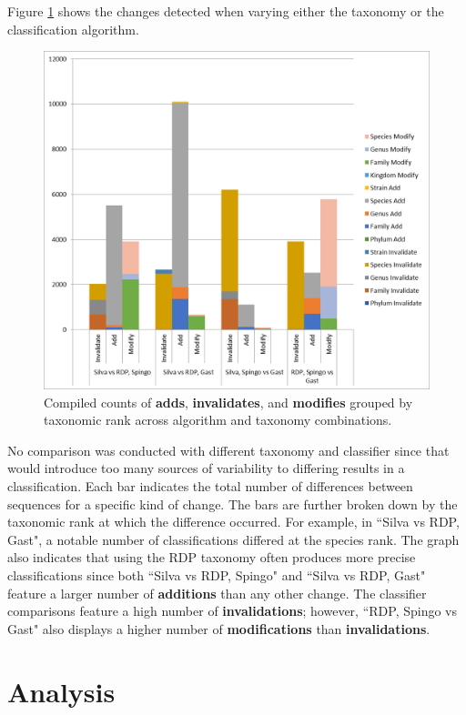 Figure \ref{mbvl_chart} shows the changes detected when varying either the taxonomy or the classification algorithm.
\begin{figure}
	\centering
	\includegraphics[scale=0.75]{figures/mbvl_chart.png}
	\caption{Compiled counts of \textbf{adds}, \textbf{invalidates}, and \textbf{modifies} grouped by taxonomic rank across algorithm and taxonomy combinations.}
	\label{mbvl_chart}
\end{figure}
No comparison was conducted with different taxonomy and classifier since that would introduce too many sources of variability to differing results in a classification.
Each bar indicates the total number of differences between sequences for a specific kind of change.
The bars are further broken down by the taxonomic rank at which the difference occurred.
For example, in ``Silva vs RDP, Gast", a notable number of classifications differed at the species rank.
The graph also indicates that using the RDP taxonomy often produces more precise classifications since both ``Silva vs RDP, Spingo" and ``Silva vs RDP, Gast" feature a larger number of \textbf{additions} than any other change.
The classifier comparisons feature a high number of \textbf{invalidations}; however, ``RDP, Spingo vs Gast" also displays a higher number of \textbf{modifications} than \textbf{invalidations}.

\section{Analysis}

